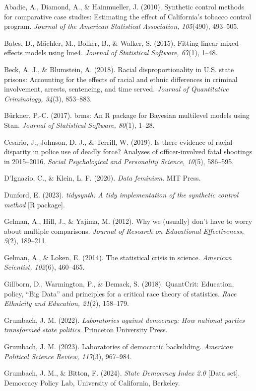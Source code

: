 \documentclass[
  12pt,
]{article}
\begin{document}
Abadie, A., Diamond, A., \& Hainmueller, J. (2010). Synthetic control
methods for comparative case studies: Estimating the effect of
California's tobacco control program. \emph{Journal of the American
Statistical Association, 105}(490), 493--505.

Bates, D., Mächler, M., Bolker, B., \& Walker, S. (2015). Fitting linear
mixed-effects models using lme4. \emph{Journal of Statistical Software,
67}(1), 1--48.

Beck, A. J., \& Blumstein, A. (2018). Racial disproportionality in U.S.
state prisons: Accounting for the effects of racial and ethnic
differences in criminal involvement, arrests, sentencing, and time
served. \emph{Journal of Quantitative Criminology, 34}(3), 853--883.

Bürkner, P.-C. (2017). brms: An R package for Bayesian multilevel models
using Stan. \emph{Journal of Statistical Software, 80}(1), 1--28.

Cesario, J., Johnson, D. J., \& Terrill, W. (2019). Is there evidence of
racial disparity in police use of deadly force? Analyses of
officer-involved fatal shootings in 2015--2016. \emph{Social
Psychological and Personality Science, 10}(5), 586--595.

D'Ignazio, C., \& Klein, L. F. (2020). \emph{Data feminism}. MIT Press.

Dunford, E. (2023). \emph{tidysynth: A tidy implementation of the
synthetic control method} {[}R package{]}.

Gelman, A., Hill, J., \& Yajima, M. (2012). Why we (usually) don't have
to worry about multiple comparisons. \emph{Journal of Research on
Educational Effectiveness, 5}(2), 189--211.

Gelman, A., \& Loken, E. (2014). The statistical crisis in science.
\emph{American Scientist, 102}(6), 460--465.

Gillborn, D., Warmington, P., \& Demack, S. (2018). QuantCrit:
Education, policy, ``Big Data'' and principles for a critical race
theory of statistics. \emph{Race Ethnicity and Education, 21}(2),
158--179.

Grumbach, J. M. (2022). \emph{Laboratories against democracy: How
national parties transformed state politics}. Princeton University
Press.

Grumbach, J. M. (2023). Laboratories of democratic backsliding.
\emph{American Political Science Review, 117}(3), 967--984.

Grumbach, J. M., \& Bitton, F. (2024). \emph{State Democracy Index 2.0}
{[}Data set{]}. Democracy Policy Lab, University of California,
Berkeley.
\end{document}

